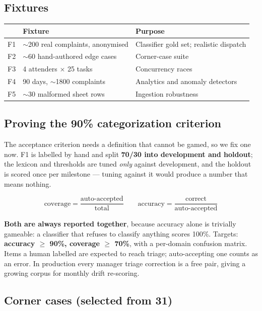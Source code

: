 \documentclass[10pt,a4paper]{article}
\begin{document}
\subsection{Fixtures}

\begin{tabularx}{\linewidth}{@{}p{1.1cm} p{4.6cm} X@{}}
\toprule
& \textbf{Fixture} & \textbf{Purpose}\\
\midrule
F1 & $\sim$200 real complaints, anonymised & Classifier gold set; realistic dispatch \\
F2 & $\sim$60 hand-authored edge cases & Corner-case suite \\
F3 & 4 attenders $\times$ 25 tasks & Concurrency races \\
F4 & 90 days, $\sim$1800 complaints & Analytics and anomaly detectors \\
F5 & $\sim$30 malformed sheet rows & Ingestion robustness \\
\bottomrule
\end{tabularx}

\subsection{Proving the 90\% categorization criterion}

The acceptance criterion needs a definition that cannot be gamed, so we fix one now. F1 is labelled
by hand and split \textbf{70/30 into development and holdout}; the lexicon and thresholds are tuned
\emph{only} against development, and the holdout is scored once per milestone --- tuning against it
would produce a number that means nothing.

\[ \text{coverage}=\frac{\text{auto-accepted}}{\text{total}} \qquad
   \text{accuracy}=\frac{\text{correct}}{\text{auto-accepted}} \]

\textbf{Both are always reported together}, because accuracy alone is trivially gameable: a
classifier that refuses to classify anything scores 100\%. Targets: \textbf{accuracy $\ge$ 90\%,
coverage $\ge$ 70\%}, with a per-domain confusion matrix. Items a human labelled 
are expected to reach triage; auto-accepting one counts as an error. In production every manager
triage correction is a free  pair, giving a growing corpus for monthly
drift re-scoring.

\subsection{Corner cases (selected from 31)}
\end{document}
